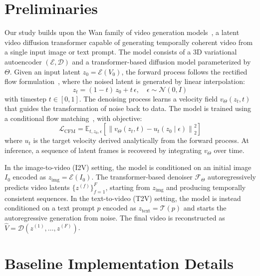 \section{Preliminaries}
\label{sec:method:preliminaries}
Our study builds upon the Wan family of video generation models~\citep{wang2025wan}, a latent video diffusion transformer capable of generating temporally coherent video from a single input image or text prompt. The model consists of a 3D variational autoencoder $(\mathcal{E}, \mathcal{D})$ and a transformer-based diffusion model parameterized by $\Theta$. Given an input latent $z_0 = \mathcal{E}(V_0)$, the forward process follows the rectified flow formulation~\citep{esser2024scaling}, where the noised latent is generated by linear interpolation:
\begin{equation}
z_t = (1 - t)\, z_0 + t\,\epsilon, \quad \epsilon \sim \mathcal{N}(0, I)
\label{eq:zt_interp}
\end{equation}
with timestep $t \in [0, 1]$. The denoising process learns a velocity field $v_\Theta(z_t, t)$ that guides the transformation of noise back to data. The model is trained using a conditional flow matching~\citep{lipman2022flow}, with objective:
\begin{equation}
\mathcal{L}_{\text{CFM}} =
\mathbb{E}_{t, z_0, \epsilon}\!\left[\left\lVert
v_\Theta(z_t, t) - u_t(z_0 \mid \epsilon)
\right\rVert_2^2\right]
\label{eq:l_cfm}
\end{equation}
where $u_t$ is the target velocity derived analytically from the forward process. At inference, a sequence of latent frames is recovered by integrating $v_\Theta$ over time.

In the image-to-video (I2V) setting, the model is conditioned on an initial image $I_0$ encoded as $z_{\text{img}} = \mathcal{E}(I_0)$. The transformer-based denoiser $\mathcal{F}_\Theta$ autoregressively predicts video latents $\{z^{(f)}\}_{f=1}^F$, starting from $z_{\text{img}}$ and producing temporally consistent sequences. In the text-to-video (T2V) setting, the model is instead conditioned on a text prompt $p$ encoded as $z_{\text{text}}=\mathcal{T}(p)$ and starts the autoregressive generation from noise. The final video is reconstructed as $\hat{V} = \mathcal{D}(z^{(1)}, \dots, z^{(F)})$.




\section{Baseline Implementation Details} 

